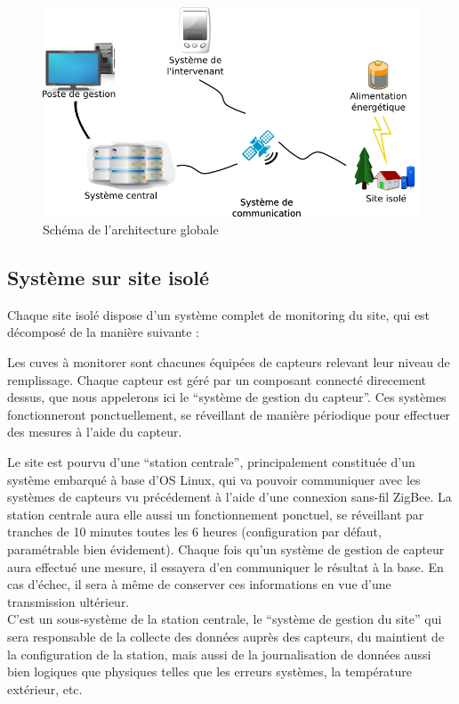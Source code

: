 \begin{figure}[hb]
  \centering
  \includegraphics[width=15cm]{schema_architecture_generale_h4111_bis.png}
  \caption[Schéma de l'architecture globale]%
  {Schéma de l'architecture globale}
\end{figure}

\subsection{Système sur site isolé}

Chaque site isolé dispose d'un système complet de monitoring du site, qui est décomposé de la manière suivante :

Les cuves à monitorer sont chacunes équipées de capteurs relevant leur niveau de remplissage. Chaque capteur est géré par un composant connecté direcement dessus, que nous appelerons ici le ``système de gestion du capteur''. Ces systèmes fonctionneront ponctuellement, se réveillant de manière périodique pour effectuer des mesures à l'aide du capteur.

Le site est pourvu d'une ``station centrale'', principalement constituée d'un système embarqué à base d'OS Linux, qui va pouvoir communiquer avec les systèmes de capteurs vu précédement à l'aide d'une connexion sans-fil ZigBee. La station centrale aura elle aussi un fonctionnement ponctuel, se réveillant par tranches de 10 minutes toutes les 6 heures (configuration par défaut, paramétrable bien évidement). Chaque fois qu'un système de gestion de capteur aura effectué une mesure, il essayera d'en communiquer le résultat à la base. En cas d'échec, il sera à même de conserver ces informations en vue d'une transmission ultérieur.\\
C'est un sous-système de la station centrale, le ``système de gestion du site'' qui sera responsable de la collecte des données auprès des capteurs, du maintient de la configuration de la station, mais aussi de la journalisation de données aussi bien logiques que physiques telles que les erreurs systèmes, la température extérieur, etc.

